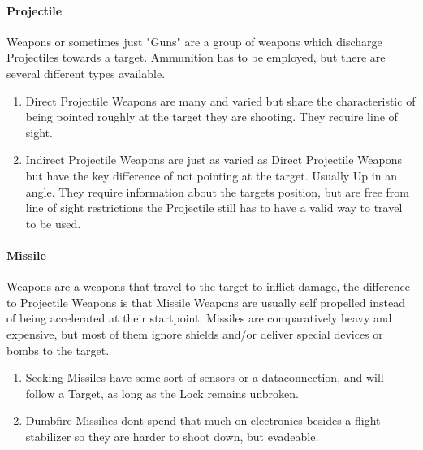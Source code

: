 \documentclass{article}
\begin{document}
        \paragraph{Projectile} Weapons or sometimes just "Guns" \newline are a group of weapons which discharge Projectiles
        towards a target. Ammunition has to be employed, but there are several different types available.
        \begin{enumerate}[label= -]
            \item{Direct} Projectile Weapons are many and varied but share the characteristic of being pointed roughly at
            the target they are shooting. They require line of sight.
            \item{Indirect} Projectile Weapons are just as varied as Direct Projectile Weapons but have the key difference
            of not pointing at the target. Usually Up in an angle. They require information about the targets position,
            but are free from line of sight restrictions the Projectile still has to have a valid way to travel to be used.
        \end{enumerate}
        \paragraph{Missile} Weapons \newline are a weapons that travel to the target to inflict damage, the difference
        to Projectile Weapons is that Missile Weapons are usually self propelled instead of being accelerated at their
        startpoint. Missiles are comparatively heavy and expensive, but most of them ignore shields and/or deliver
        special devices or bombs to the target.

        \begin{enumerate}[label= -]
            \item{Seeking} Missiles have some sort of sensors or a dataconnection, and will follow a Target, as long as the Lock
            remains unbroken.
            \item{Dumbfire} Missilies dont spend that much on electronics besides a flight stabilizer so they are
            harder to shoot down, but evadeable.
        \end{enumerate}
\end{document}
